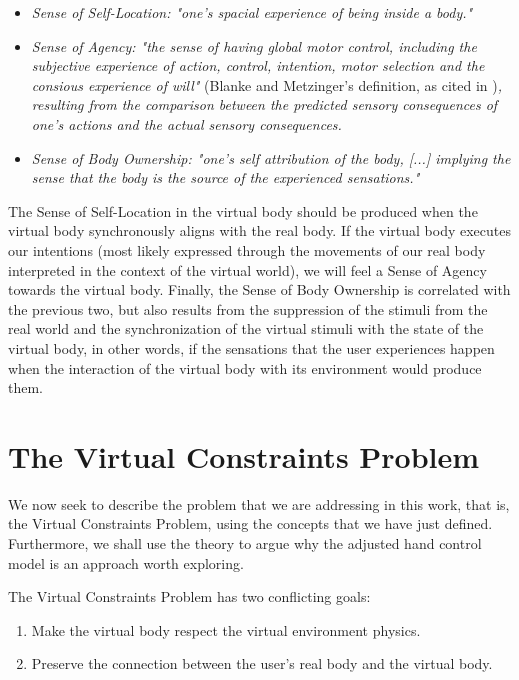 \begin{displayquote}
\begin{itemize}
\item \textit{Sense of Self-Location: "one's spacial experience of being inside a body."}
\item \textit{Sense of Agency: "the sense of having global motor control, including the subjective experience of action, control, intention, motor selection and the consious experience of will"} (Blanke and Metzinger's definition, as cited in \parencite{Kilteni2012})\textit{, resulting from the comparison between the predicted sensory consequences of one's actions and the actual sensory consequences.}
\item \textit{Sense of Body Ownership: "one's self attribution of the body, [...] implying the sense that the body is the source of the experienced sensations."}
\end{itemize}
\end{displayquote}

The Sense of Self-Location in the virtual body should be produced when the virtual body synchronously aligns with the real body. If the virtual body executes our intentions (most likely expressed through the movements of our real body interpreted in the context of the virtual world), we will feel a Sense of Agency towards the virtual body. Finally, the Sense of Body Ownership is correlated with the previous two, but also results from the suppression of the stimuli from the real world \parencite{Schubert1999} and the synchronization of the virtual stimuli with the state of the virtual body, in other words, if the sensations that the user experiences happen when the interaction of the virtual body with its environment would produce them.

\section{The Virtual Constraints Problem}
\label{sec:virtualContraintsProblem}

We now seek to describe the problem that we are addressing in this work, that is, the Virtual Constraints Problem, using the concepts that we have just defined. Furthermore, we shall use the theory to argue why the adjusted hand control model is an approach worth exploring.

The Virtual Constraints Problem has two conflicting goals:

\begin{enumerate}
\item Make the virtual body respect the virtual environment physics.
\item Preserve the connection between the user's real body and the virtual body.
\end{enumerate}

